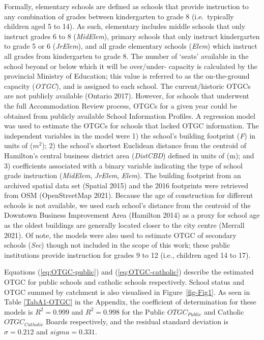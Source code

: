 \documentclass[
default
]{sn-jnl}
\begin{document}
Formally, elementary schools are defined as schools that provide
instruction to any combination of grades between kindergarten to grade 8
(i.e.~typically children aged 5 to 14). As such, elementary includes
middle schools that only instruct grades 6 to 8 (\emph{MidElem}),
primary schools that only instruct kindergarten to grade 5 or 6
(\emph{JrElem}), and all grade elementary schools (\emph{Elem}) which
instruct all grades from kindergarten to grade 8. The number of `seats'
available in the school beyond or below which it will be over/under-
capacity is calculated by the provincial Ministry of Education; this
value is referred to as the on-the-ground capacity (\emph{OTGC}), and is
assigned to each school. The current/historic OTGCs are not publicly
available (Ontario 2017). However, for schools that underwent the full
Accommodation Review process, OTGCs for a given year could be obtained
from publicly available School Information Profiles. A regression model
was used to estimate the OTGCs for schools that lacked OTGC information.
The independent variables in the model were 1) the school's building
footprint (\emph{F}) in units of (\(m^2\)); 2) the school's shortest
Euclidean distance from the centroid of Hamilton's central business
district area (\emph{DistCBD}) defined in units of (m); and 3)
coefficients associated with a binary variable indicating the type of
school grade instruction (\emph{MidElem}, \emph{JrElem}, \emph{Elem}).
The building footprint from an archived spatial data set (Spatial 2015)
and the 2016 footprints were retrieved from OSM (OpenStreetMap 2021).
Because the age of construction for different schools is not available,
we used each school's distance from the centroid of the Downtown
Business Improvement Area (Hamilton 2014) as a proxy for school age as
the oldest buildings are generally located closer to the city centre
(Merrall 2021). Of note, the models were also used to estimate OTGC of
secondary schools (\emph{Sec}) though not included in the scope of this
work; these public institutions provide instruction for grades 9 to 12
(i.e., children aged 14 to 17).

Equations (\ref{eq:OTGC-public}) and (\ref{eq:OTGC-catholic}) describe
the estimated OTGC for public schools and catholic schools respectively.
School status and OTGC summed by catchment is also visualised in
Figure~\ref{fig-Fig1}. As seen in Table \ref{TabA1-OTGC} in the
Appendix, the coefficient of determination for these models is
\(R^2 = 0.999\) and \(R^2 = 0.998\) for the Public \(OTGC_{Public}\) and
Catholic \(OTGC_{Catholic}\) Boards respectively, and the residual
standard deviation is \(\sigma = 0.212\) and \(sigma = 0.331\).
\end{document}

